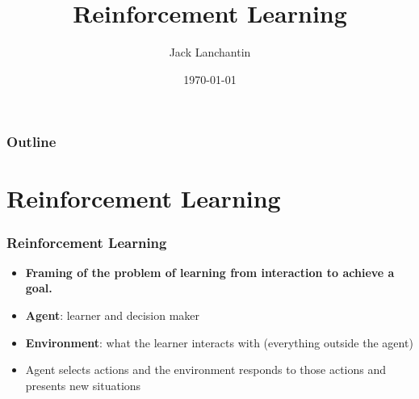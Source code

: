 \documentclass{beamer}
\title[Reinforcement Learning]{Reinforcement Learning} %
\author{Jack Lanchantin} %
\date{\today} %
\begin{document}
\begin{frame}
\titlepage %
\end{frame}

\begin{frame}
\frametitle{Outline} %
\tableofcontents %
\end{frame}

\section{Reinforcement Learning} %

\begin{frame}
\frametitle{Reinforcement Learning}
\begin{itemize}
\item \textbf{Framing of the problem of learning from interaction to achieve a goal.}
\item \textbf{Agent}: learner and decision maker
\item \textbf{Environment}: what the learner interacts with (everything outside the agent)
\item Agent selects actions and the environment responds to those actions and presents new situations
\end{itemize}
\end{frame}

\end{document}
